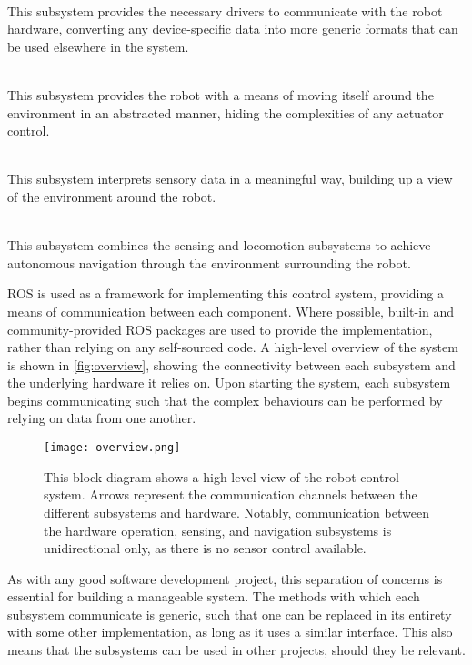 \begin{description}[labelindent=\parindent]
	\item[Hardware Operations] \hfill \\
	This subsystem provides the necessary drivers to communicate with the robot hardware, converting any device-specific data into more generic formats that can be used elsewhere in the system.

	\item[Locomotion] \hfill \\
	This subsystem provides the robot with a means of moving itself around the environment in an abstracted manner, hiding the complexities of any actuator control.

	\item[Sensing] \hfill \\
	This subsystem interprets sensory data in a meaningful way, building up a view of the environment around the robot.

	\item[Navigation] \hfill \\
	This subsystem combines the sensing and locomotion subsystems to achieve autonomous navigation through the environment surrounding the robot.
\end{description}

ROS is used as a framework for implementing this control system, providing a means of communication between each component. Where possible, built-in and community-provided ROS packages are used to provide the implementation, rather than relying on any self-sourced code. A high-level overview of the system is shown in \autoref{fig:overview}, showing the connectivity between each subsystem and the underlying hardware it relies on. Upon starting the system, each subsystem begins communicating such that the complex behaviours can be performed by relying on data from one another.

\begin{figure}[!h]
	\centering
	\texttt{[image: overview.png]}
	\caption{This block diagram shows a high-level view of the robot control system. Arrows represent the communication channels between the different subsystems and hardware. Notably, communication between the hardware operation, sensing, and navigation subsystems is unidirectional only, as there is no sensor control available.}
	\label{fig:overview}
\end{figure}

As with any good software development project, this separation of concerns is essential for building a manageable system. The methods with which each subsystem communicate is generic, such that one can be replaced in its entirety with some other implementation, as long as it uses a similar interface. This also means that the subsystems can be used in other projects, should they be relevant.

